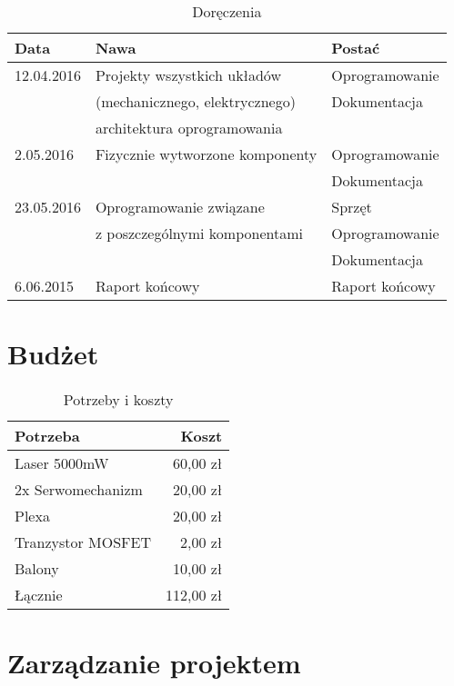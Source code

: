 \documentclass[a4paper, 11pt]{article}
\begin{document}
\begin{table}[h]
\caption{Doręczenia}
\label{Doręczenia}

\begin{tabular}{|l|l|l|} \hline
Data & Nawa & Postać \\ \hline
12.04.2016 & Projekty wszystkich układów & Oprogramowanie \\
 & (mechanicznego, elektrycznego) & Dokumentacja \\
 & architektura oprogramowania & \\ \hline

2.05.2016 & Fizycznie wytworzone komponenty & Oprogramowanie \\
 & & Dokumentacja \\ \hline
 
23.05.2016 & Oprogramowanie związane & Sprzęt \\
 & z poszczególnymi komponentami & Oprogramowanie \\
 & & Dokumentacja \\ \hline
6.06.2015 & Raport końcowy & Raport końcowy \\ \hline
\end{tabular}
\end{table}

\section{Budżet}

\begin{table}[h]
\caption{Potrzeby i koszty}
\label{Budżet}

\begin{tabular}{|l|r|} \hline
Potrzeba & Koszt \\ \hline
Laser 5000mW & 60,00 zł \\ \hline
2x Serwomechanizm & 20,00 zł \\ \hline
Plexa & 20,00 zł \\ \hline
Tranzystor MOSFET & 2,00 zł \\ \hline
Balony & 10,00 zł \\ \hline \hline
Łącznie & 112,00 zł \\ \hline
\end{tabular}
\end{table}

\newpage
\section{Zarządzanie projektem}
\end{document}
